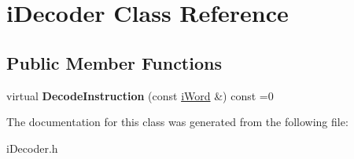 \hypertarget{classiDecoder}{
\section{iDecoder Class Reference}
\label{classiDecoder}
}
\subsection*{Public Member Functions}
\begin{DoxyCompactItemize}
\item 
\hypertarget{classiDecoder_a1b9e47d311772df5496467b529934885}{
virtual {\bfseries DecodeInstruction} (const \hyperlink{classiWord}{iWord} \&) const =0}
\label{classiDecoder_a1b9e47d311772df5496467b529934885}

\end{DoxyCompactItemize}


The documentation for this class was generated from the following file:\begin{DoxyCompactItemize}
\item 
iDecoder.h\end{DoxyCompactItemize}
